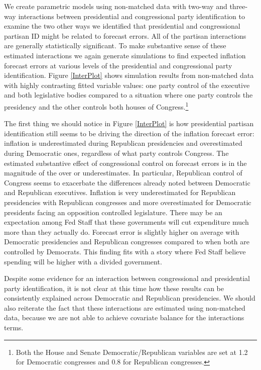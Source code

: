 \documentclass[a4paper]{article}\usepackage{graphicx, color}
\begin{document}
We create parametric models using non-matched data with two-way and three-way interactions between presidential and congressional party identification to examine the two other ways we identified that presidential and congressional partisan ID might be related to forecast errors. All of the partisan interactions are generally statistically significant. To make substantive sense of these estimated interactions we again generate simulations to find expected inflation forecast errors at various levels of the presidential and congressional party identification. Figure \ref{InterPlot} shows simulation results from non-matched data with highly contrasting fitted variable values: one party control of the executive and both legislative bodies compared to a situation where one party controls the presidency and the other controls both houses of Congress.\footnote{Both the House and Senate Democratic/Republican variables are set at 1.2 for Democratic congresses and 0.8 for Republican congresses.} 

The first thing we should notice in Figure \ref{InterPlot} is how presidential partisan identification still seems to be driving the direction of the inflation forecast error: inflation is underestimated during Republican presidencies and overestimated during Democratic ones, regardless of what party controls Congress. The estimated substantive effect of congressional control on forecast errors is in the magnitude of the over or underestimates. In particular, Republican control of Congress seems to exacerbate the differences already noted between Democratic and Republican executives. Inflation is very underestimated for Republican presidencies with Republican congresses and more overestimated for Democratic presidents facing an opposition controlled legislature. There may be an expectation among Fed Staff that these governments will cut expenditure much more than they actually do. Forecast error is slightly higher on average with Democratic presidencies and Republican congresses compared to when both are controlled by Democrats. This finding fits with a story where Fed Staff believe spending will be higher with a divided government. 

Despite some evidence for an interaction between congressional and presidential party identification, it is not clear at this time how these results can be consistently explained across Democratic and Republican presidencies. We should also reiterate the fact that these interactions are estimated using non-matched data, because we are not able to achieve covariate balance for the interactions terms.
\end{document}
